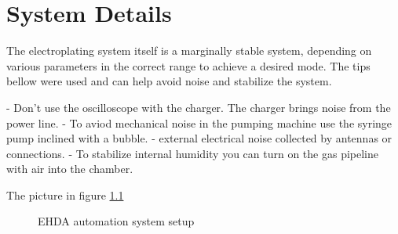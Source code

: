 \chapter{System Details}

The electroplating system itself is a marginally stable system, depending on various parameters in the correct range to achieve a desired mode.
The tips bellow were used and can help avoid noise and stabilize the system.

- Don't use the oscilloscope with the charger. The charger brings noise from the power line.
- To aviod mechanical noise in the pumping machine use the syringe pump inclined with a bubble.
- external electrical noise collected by antennas or connections.
- To stabilize internal humidity you can turn on the gas pipeline with air into the chamber.

The picture in figure \ref{fig:setup_pic}

\begin{figure}[H]
  \centering
  \caption{EHDA automation system setup}
  \label{fig:setup_pic}
\end{figure}

